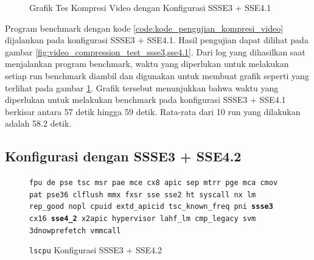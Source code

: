 \begin{figure}
    \centering
    \caption{Grafik Tes Kompresi Video dengan Konfigurasi SSSE3 + SSE4.1}
    \label{fig:video_compression_test_ssse3,sse4.1_graph}
\end{figure}

Program benchmark dengan kode \ref{code:kode_pengujian_kompresi_video} dijalankan pada konfigurasi SSSE3 + SSE4.1. Hasil pengujian dapat dilihat pada gambar \ref{fig:video_compression_test_ssse3,sse4.1}. Dari log yang dihasilkan saat menjalankan program benchmark, waktu yang diperlukan untuk melakukan setiap run benchmark diambil dan digunakan untuk membuat grafik seperti yang terlihat pada gambar \ref{fig:video_compression_test_ssse3,sse4.1_graph}. Grafik tersebut menunjukkan bahwa waktu yang diperlukan untuk melakukan benchmark pada konfigurasi SSSE3 + SSE4.1 berkisar antara 57 detik hingga 59 detik. Rata-rata dari 10 run yang dilakukan adalah 58.2 detik.

\subsection{Konfigurasi dengan SSSE3 + SSE4.2}
\begin{figure}
    \texttt{fpu de pse tsc msr pae mce cx8 apic sep mtrr pge mca cmov pat pse36 clflush mmx fxsr sse sse2 ht syscall nx lm rep\_good nopl cpuid extd\_apicid tsc\_known\_freq pni \textbf{ssse3} cx16 \textbf{sse4\_2} x2apic hypervisor lahf\_lm cmp\_legacy svm 3dnowprefetch vmmcall}
    \caption{\texttt{lscpu} Konfigurasi SSSE3 + SSE4.2}
    \label{fig:lscpu_video_compression_test_ssse3,sse4.2}
\end{figure}

